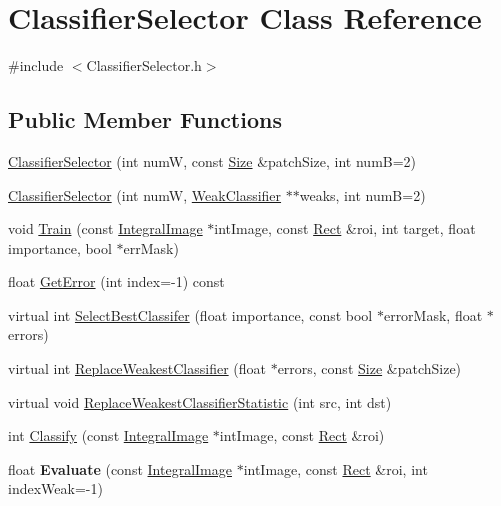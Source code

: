 \hypertarget{classClassifierSelector}{}\section{Classifier\+Selector Class Reference}
\label{classClassifierSelector}


{\ttfamily \#include $<$Classifier\+Selector.\+h$>$}

\subsection*{Public Member Functions}
\begin{DoxyCompactItemize}
\item 
\hyperlink{classClassifierSelector_a21eb14f2ad33c62dd94fdfced0d8d9e6}{Classifier\+Selector} (int num\+W, const \hyperlink{classSize}{Size} \&patch\+Size, int num\+B=2)
\item 
\hyperlink{classClassifierSelector_a6bf8094c2c8afde715ab75e729efa4af}{Classifier\+Selector} (int num\+W, \hyperlink{classWeakClassifier}{Weak\+Classifier} $\ast$$\ast$weaks, int num\+B=2)
\item 
void \hyperlink{classClassifierSelector_afd948f69609ddac9d1effb6b899c4d08}{Train} (const \hyperlink{classIntegralImage}{Integral\+Image} $\ast$int\+Image, const \hyperlink{classRect}{Rect} \&roi, int target, float importance, bool $\ast$err\+Mask)
\item 
float \hyperlink{classClassifierSelector_ac7f854deb91854b56f24660b77e702ed}{Get\+Error} (int index=-\/1) const 
\item 
virtual int \hyperlink{classClassifierSelector_aa146f727c4d0d212935885bec3c63ed8}{Select\+Best\+Classifer} (float importance, const bool $\ast$error\+Mask, float $\ast$errors)
\item 
virtual int \hyperlink{classClassifierSelector_ac01dd0dfee31bfbfbbc6b5c28f36a021}{Replace\+Weakest\+Classifier} (float $\ast$errors, const \hyperlink{classSize}{Size} \&patch\+Size)
\item 
virtual void \hyperlink{classClassifierSelector_a07a0717148abf071a4bc3785b72bb3d3}{Replace\+Weakest\+Classifier\+Statistic} (int src, int dst)
\item 
int \hyperlink{classClassifierSelector_acaca168ce5bb47624157c7559cc56108}{Classify} (const \hyperlink{classIntegralImage}{Integral\+Image} $\ast$int\+Image, const \hyperlink{classRect}{Rect} \&roi)
\item 
\hypertarget{classClassifierSelector_a580884e2c9069f9377c1ff49373c22ff}{}float {\bfseries Evaluate} (const \hyperlink{classIntegralImage}{Integral\+Image} $\ast$int\+Image, const \hyperlink{classRect}{Rect} \&roi, int index\+Weak=-\/1)\label{classClassifierSelector_a580884e2c9069f9377c1ff49373c22ff}


\end{DoxyCompactItemize}

